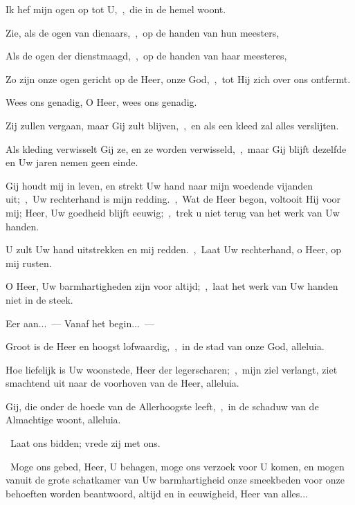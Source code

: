 \documentclass[12pt,twoside,a5paper]{article}
\begin{document}
\begin{halfparskip}
  Ik hef mijn ogen op tot U,~\sep\ die in de hemel woont.

  Zie, als de ogen van dienaars,~\sep\ op de handen van hun meesters,

  Als de ogen der dienstmaagd,~\sep\ op de handen van haar meesteres,

  Zo zijn onze ogen gericht op de Heer, onze God,~\sep\ tot Hij zich over ons ontfermt.

  Wees ons genadig, O Heer, wees ons genadig.

   Zij zullen vergaan, maar Gij zult blijven,~\sep\ en als een kleed zal alles verslijten.

  Als kleding verwisselt Gij ze, en ze worden verwisseld,~\sep\ maar Gij blijft dezelfde en Uw jaren nemen geen einde.

   Gij houdt mij in leven, en strekt Uw hand naar mijn woedende vijanden uit;~\sep\ Uw rechterhand is mijn redding.~\sep\ Wat de Heer begon, voltooit Hij voor mij; Heer, Uw goedheid blijft eeuwig;~\sep\ trek u niet terug van het werk van Uw handen.

   U zult Uw hand uitstrekken en mij redden.~\sep\ Laat Uw rechterhand, o Heer, op mij rusten.

  O Heer, Uw barmhartigheden zijn voor altijd;~\sep\ laat het werk van Uw handen niet in de steek.

  Eer aan...~---  Vanaf het begin...~--- 

   Groot is de Heer en hoogst lofwaardig,~\sep\ in de stad van onze God, alleluia.

   Hoe liefelijk is Uw woonstede, Heer der legerscharen;~\sep\ mijn ziel verlangt, ziet smachtend uit naar de voorhoven van de Heer, alleluia.

   Gij, die onder de hoede van de Allerhoogste leeft,~\sep\ in de schaduw van de Almachtige woont, alleluia.
\end{halfparskip}


\begin{halfparskip}
  \dd~Laat ons bidden; vrede zij met ons.

  \cc~Moge ons gebed, Heer, U behagen, moge ons verzoek voor U komen, en mogen vanuit de grote schatkamer van Uw barmhartigheid onze smeekbeden voor onze behoeften worden beantwoord, altijd en in eeuwigheid, Heer van alles...
\end{halfparskip}
\end{document}
